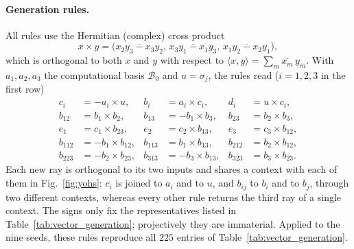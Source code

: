 \documentclass[%
  reprint,
  superscriptaddress,
  showkeys,
  amsmath,amssymb,
  aps,pra,
  longbibliography,
  floatfix,
  x11names
]{revtex4-2}
\begin{document}
\paragraph*{Generation rules.}
All rules use the Hermitian (complex) cross product~\cite{harding2025remarksIJTP}
\[
x\times y=\bigl(\overline{x_2y_3-x_3y_2},\,\overline{x_3y_1-x_1y_3},\,\overline{x_1y_2-x_2y_1}\bigr),
\]
which is orthogonal to both $x$ and $y$ with respect to $\langle x,y\rangle=\sum_m\overline{x_m}\,y_m$.  With $a_1,a_2,a_3$ the computational basis $\mathcal{B}_0$ and $u=\sigma_j$, the rules read ($i=1,2,3$ in the first row)
\begin{align*}
c_i&=-a_i\times u, & b_i&=a_i\times c_i, & d_i&=u\times c_i,\\
b_{12}&=b_1\times b_2, & b_{13}&=-b_1\times b_3, & b_{23}&=b_2\times b_3,\\
e_1&=c_1\times b_{23}, & e_2&=c_2\times b_{13}, & e_3&=c_3\times b_{12},\\
b_{112}&=-b_1\times b_{12}, & b_{113}&=b_1\times b_{13}, & b_{212}&=b_2\times b_{12},\\
b_{223}&=-b_2\times b_{23}, & b_{313}&=-b_3\times b_{13}, & b_{323}&=b_3\times b_{23}.
\end{align*}
Each new ray is orthogonal to its two inputs and shares a context with each of them in Fig.~\ref{fig:yohs}: $c_i$ is joined to $a_i$ and to $u$, and $b_{ij}$ to $b_i$ and to $b_j$, through two different contexts, whereas every other rule returns the third ray of a single context.  The signs only fix the representatives listed in Table~\ref{tab:vector_generation}; projectively they are immaterial.  Applied to the nine seeds, these rules reproduce all $225$ entries of Table~\ref{tab:vector_generation}.
\end{document}
